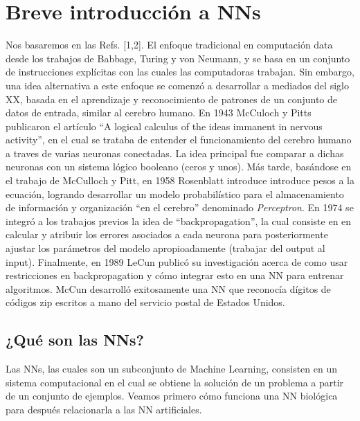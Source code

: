 \documentclass{article}
\begin{document}
\section{Breve introducción a NNs}

Nos basaremos en las Refs. [1,2]. El enfoque tradicional en computación data desde los trabajos de Babbage, Turing y von Neumann, y se basa en un conjunto de instrucciones explícitas con las cuales las computadoras trabajan. Sin embargo, una idea alternativa a este enfoque se comenzó a desarrollar a mediados del siglo XX, basada en el aprendizaje y reconocimiento de patrones de un conjunto de datos de entrada, similar al cerebro humano. En 1943 McCuloch y Pitts publicaron el artículo ``A logical calculus of the ideas immanent in nervous activity'', en el cual se trataba de entender el funcionamiento del cerebro humano a traves de varias neuronas conectadas. La idea principal fue comparar a dichas neuronas con un sistema lógico booleano (ceros y unos). Más tarde, basándose en el trabajo de McCulloch y Pitt, en 1958 Rosenblatt introduce introduce pesos a la ecuación, logrando desarrollar un modelo probabilístico para el almacenamiento de información y organización ``en el cerebro'' denominado \textit{Perceptron}. En 1974 se integró a los trabajos previos la idea de ``backpropagation'', la cual consiste en en calcular y atribuir los errores asociados a cada neurona para posteriormente ajustar los parámetros del modelo apropioadamente (trabajar del output al input). Finalmente, en 1989 LeCun publicó su investigación acerca de como usar restricciones en backpropagation y cómo integrar esto en una NN para entrenar algoritmos. McCun desarrolló exitosamente una NN que reconocía dígitos de códigos zip escritos a mano del servicio postal de Estados Unidos.\\

\subsection{¿Qué son las NNs?}
Las NNs, las cuales son un subconjunto de Machine Learning, consisten en un sistema computacional en el cual se obtiene la solución de un problema a partir de un conjunto de ejemplos. Veamos primero cómo funciona una NN biológica para después relacionarla a las NN artificiales.\\
\end{document}
